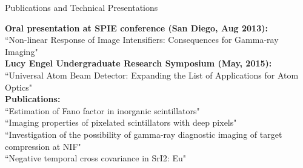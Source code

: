 \documentclass{resume} %
\begin{document}
\begin{rSection}{Publications and Technical Presentations}
	
{\bf Oral presentation at SPIE conference (San Diego, Aug 2013):} \\
{``Non-linear Response of Image Intensifiers: Consequences for Gamma-ray Imaging"}\\
{\bf Lucy Engel Undergraduate Research Symposium (May, 2015):}\\
{``Universal Atom Beam Detector: Expanding the List of Applications for Atom Optics"}\\
{\bf Publications:}\\	
{``Estimation of Fano factor in inorganic scintillators"}\\
{``Imaging properties of pixelated scintillators with deep pixels"}\\
{``Investigation of the possibility of gamma-ray diagnostic imaging of target compression at NIF"}\\
{``Negative temporal cross covariance in SrI2: Eu"}\\

\end{rSection}




\end{document}
